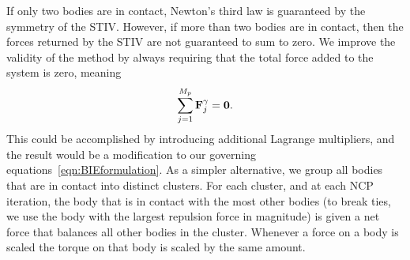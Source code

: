 \documentclass[AMA,STIX1COL]{WileyNJD-v2}
\begin{document}
If only two bodies are in contact, Newton's third law is guaranteed by
the symmetry of the STIV.  However, if more than two bodies are in
contact, then the forces returned by the STIV are not guaranteed to sum
to zero.  We improve the validity of the method by always requiring that
the total force added to the system is zero, meaning
\begin{align*}
  \sum_{j=1}^{M_p} {\mathbf{F}}^\gamma_j = \mathbf{0}. 
\end{align*}
This could be accomplished by introducing additional Lagrange
multipliers, and the result would be a modification to our governing
equations~\eqref{eqn:BIEformulation}.  As a simpler alternative, we
group all bodies that are in contact into distinct clusters.  For each
cluster, and at each NCP iteration, the body that is in contact with the
most other bodies (to break ties, we use the body with the largest
repulsion force in magnitude) is given a net force that balances all
other bodies in the cluster. Whenever a force on a body is scaled the
torque on that body is scaled by the same amount.

\end{document}
